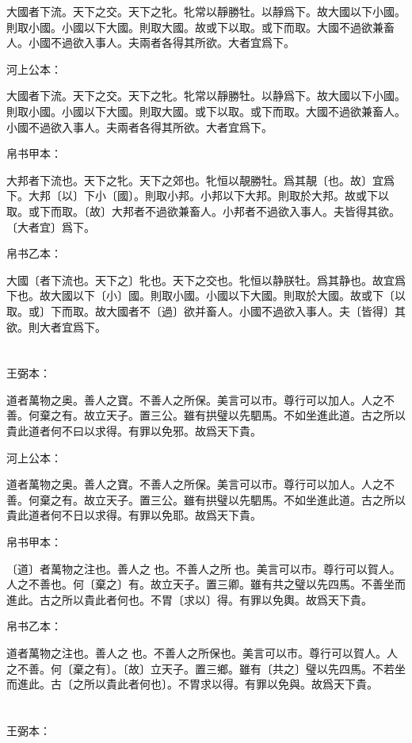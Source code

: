 \documentclass[a5paper]{ctexbook}
\begin{document}
    大國者下流。天下之交。天下之牝。牝常以靜勝牡。以靜爲下。故大國以下小國。則取小國。小國以下大國。則取大國。故或下以取。或下而取。大國不過欲兼畜人。小國不過欲入事人。夫兩者各得其所欲。大者宜爲下。

    河上公本：

    大國者下流。天下之交。天下之牝。牝常以靜勝牡。以静爲下。故大國以下小國。則取小國。小國以下大國。則取大國。或下以取。或下而取。大國不過欲兼畜人。小國不過欲入事人。夫兩者各得其所欲。大者宜爲下。

    帛书甲本：

    大邦者下流也。天下之牝。天下之郊也。牝恒以靚勝牡。爲其靚〔也。故〕宜爲下。大邦〔以〕下小〔國〕。則取小邦。小邦以下大邦。則取於大邦。故或下以取。或下而取。〔故〕大邦者不過欲兼畜人。小邦者不過欲入事人。夫皆得其欲。〔大者宜〕爲下。

    帛书乙本：

    大國〔者下流也。天下之〕牝也。天下之交也。牝恒以静朕牡。爲其静也。故宜爲下也。故大國以下〔小〕國。則取小國。小國以下大國。則取於大國。故或下〔以取。或〕下而取。故大國者不〔過〕欲并畜人。小國不過欲入事人。夫〔皆得〕其欲。則大者宜爲下。

    \chapter{}
    王弼本：

    道者萬物之奥。善人之寶。不善人之所保。美言可以市。尊行可以加人。人之不善。何棄之有。故立天子。置三公。雖有拱璧以先駟馬。不如坐進此道。古之所以貴此道者何不曰以求得。有罪以免邪。故爲天下貴。

    河上公本：

    道者萬物之奥。善人之寶。不善人之所保。美言可以市。尊行可以加人。人之不善。何棄之有。故立天子。置三公。雖有拱璧以先駟馬。不如坐進此道。古之所以貴此道者何不日以求得。有罪以免耶。故爲天下貴。

    帛书甲本：

    〔道〕者萬物之注也。善人之󱀘也。不善人之所󱀘也。美言可以市。尊行可以賀人。人之不善也。何〔棄之〕有。故立天子。置三卿。雖有共之璧以先四馬。不善坐而進此。古之所以貴此者何也。不胃〔求以〕得。有罪以免輿。故爲天下貴。

    帛书乙本：

    道者萬物之注也。善人之󱀘也。不善人之所保也。美言可以市。尊行可以賀人。人之不善。何〔棄之有〕。〔故〕立天子。置三鄉。雖有〔共之〕璧以先四馬。不若坐而進此。古〔之所以貴此者何也〕。不胃求以得。有罪以免與。故爲天下貴。

    \chapter{}
    王弼本：
\end{document}
